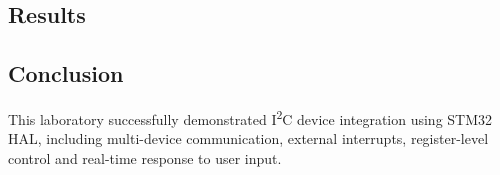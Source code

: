 \subsection{Results}




\subsection{Conclusion}

This laboratory successfully demonstrated I\textsuperscript{2}C device integration using STM32 HAL, including multi-device communication, external interrupts, register-level control and real-time response to user input. 
